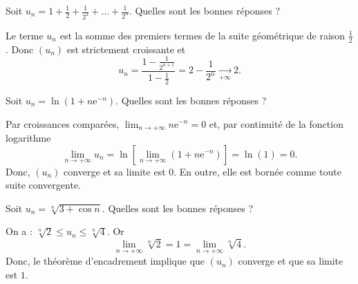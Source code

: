 \begin{question}
Soit $\displaystyle u_n=1+\frac{1}{2}+\frac{1}{2^2}+\dots +\frac{1}{2^n}$. Quelles sont les bonnes réponses ?
\begin{answers}  
\end{answers}
\begin{explanations}
Le terme $u_n$ est la somme des premiers termes de la suite géométrique de raison $\displaystyle \frac{1}{2}$. Donc $(u_n)$ est strictement croissante et
$$u_n=\frac{1-\frac{1}{2^{n+1}}}{1-\frac{1}{2}}=2-\frac{1}{2^n}\underset{+\infty}{\longrightarrow }2.$$
\end{explanations}
\end{question}



\begin{question}
Soit $\displaystyle u_n=\ln \left(1+n\mathrm{e}^{-n}\right)$. Quelles sont les bonnes réponses ?
\begin{answers}
\end{answers}
\begin{explanations}
Par croissances comparées, $\displaystyle \lim _{n\to +\infty}n\mathrm{e}^{-n}=0$ et, par continuité de la fonction logarithme
$$\lim _{n\to +\infty}u_n=\ln \left[\lim _{n\to +\infty}\left(1+n\mathrm{e}^{-n}\right)\right]=\ln (1)=0.$$
Donc, $(u_n)$ converge et sa limite est $0$. En outre, elle est bornée comme toute suite convergente.
\end{explanations}
\end{question}




\begin{question}
Soit $\displaystyle u_n=\sqrt[n]{3+\cos n}$. Quelles sont les bonnes réponses ?
\begin{answers}
\end{answers}
\begin{explanations}
On a : $\displaystyle \sqrt[n]{2}\leq u_n\leq \sqrt[n]{4}$. Or 
$$\lim _{n\to +\infty}\sqrt[n]{2}=1=\lim _{n\to +\infty}\sqrt[n]{4}.$$
Donc, le théorème d'encadrement implique que $(u_n)$ converge et que sa limite est $1$.
\end{explanations}
\end{question}




